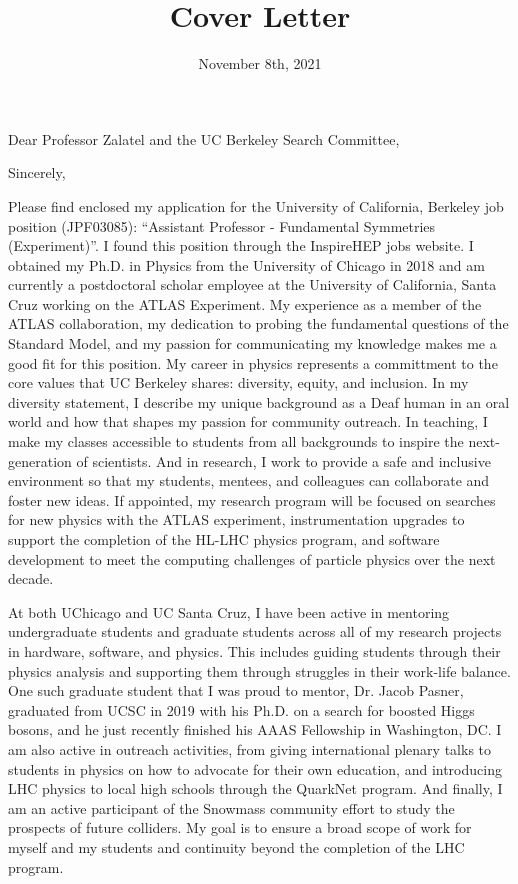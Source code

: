 \documentclass[10pt,letterpaper,sans]{moderncv/moderncv} %
\title{Cover Letter}
\begin{document}
\date{November 8th, 2021}
\opening{Dear Professor Zalatel and the UC Berkeley Search Committee,}
\closing{Sincerely,}

\makelettertitle

Please find enclosed my application for the University of California, Berkeley job position (JPF03085): ``Assistant Professor - Fundamental Symmetries (Experiment)''. I found this position through the InspireHEP jobs website. I obtained my Ph.D. in Physics from the University of Chicago in 2018 and am currently a postdoctoral scholar employee at the University of California, Santa Cruz working on the ATLAS Experiment. My experience as a member of the ATLAS collaboration, my dedication to probing the fundamental questions of the Standard Model, and my passion for communicating my knowledge makes me a good fit for this position. My career in physics represents a committment to the core values that UC Berkeley shares: diversity, equity, and inclusion. In my diversity statement, I describe my unique background as a Deaf human in an oral world and how that shapes my passion for community outreach. In teaching, I make my classes accessible to students from all backgrounds to inspire the next-generation of scientists. And in research, I work to provide a safe and inclusive environment so that my students, mentees, and colleagues can collaborate and foster new ideas. If appointed, my research program will be focused on searches for new physics with the ATLAS experiment, instrumentation upgrades to support the completion of the HL-LHC physics program, and software development to meet the computing challenges of particle physics over the next decade.

At both UChicago and UC Santa Cruz, I have been active in mentoring undergraduate students and graduate students across all of my research projects in hardware, software, and physics. This includes guiding students through their physics analysis and supporting them through struggles in their work-life balance. One such graduate student that I was proud to mentor, Dr. Jacob Pasner, graduated from UCSC in 2019 with his Ph.D. on a search for boosted Higgs bosons, and he just recently finished his AAAS Fellowship in Washington, DC. I am also active in outreach activities, from giving international plenary talks to students in physics on how to advocate for their own education, and introducing LHC physics to local high schools through the QuarkNet program. And finally, I am an active participant of the Snowmass community effort to study the prospects of future colliders. My goal is to ensure a broad scope of work for myself and my students and continuity beyond the completion of the LHC program.
\end{document}
